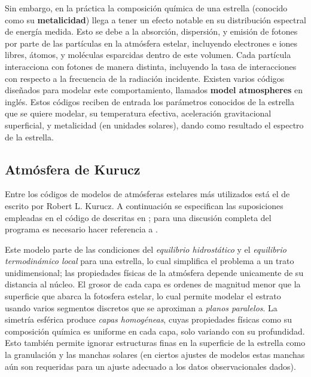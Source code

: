 Sin embargo, en la práctica la composición química de una estrella (conocido
como su \textbf{metalicidad}) llega a tener un efecto notable en su distribución
espectral de energía medida. Esto se debe a la absorción, dispersión, y emisión
de fotones por parte de las partículas en la atmósfera estelar, incluyendo
electrones e iones libres, átomos, y moléculas esparcidas dentro de este
volumen. Cada partícula interacciona con fotones de manera distinta, incluyendo
la tasa de interacciones con respecto a la frecuencia de la radiación incidente.
Existen varios códigos diseñados para modelar este comportamiento, llamados
\textbf{model atmospheres} en inglés. Estos códigos reciben de entrada los
parámetros conocidos de la estrella que se quiere modelar, su temperatura
efectiva, aceleración gravitacional superficial, y metalicidad (en unidades
solares), dando como resultado el espectro de la estrella.

\subsection{Atmósfera de Kurucz}

Entre los códigos de modelos de atmósferas estelares más utilizados está el de
 escrito por Robert L. Kurucz. A continuación se especifican las
suposiciones empleadas en el código de  descritas en
; para una discusión completa
del programa es necesario hacer referencia a .

Este modelo parte de las condiciones del \textit{equilibrio hidrostático} y el
\textit{equilibrio termodinámico local} para una estrella, lo cual simplifica el
problema a un trato unidimensional; las propiedades físicas de la atmósfera
depende unicamente de su distancia al núcleo. El grosor de cada capa es ordenes
de magnitud menor que la superficie que abarca la fotosfera estelar, lo cual
permite modelar el estrato usando varios segmentos discretos que se aproximan a
\textit{planos paralelos}. La simetría esférica produce \textit{capas
homogéneas}, cuyas propiedades físicas como su composición química es uniforme
en cada capa, solo variando con su profundidad. Esto también permite ignorar
estructuras finas en la superficie de la estrella como la granulación y las
manchas solares (en ciertos ajustes de modelos estas manchas aún son requeridas
para un ajuste adecuado a los datos observacionales dados). %

